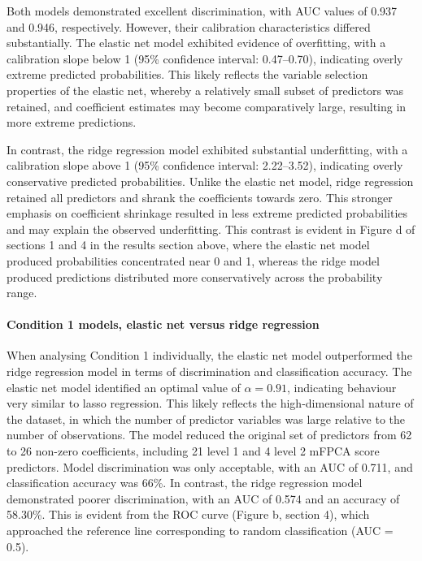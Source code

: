 \documentclass{article}
\begin{document}
Both models demonstrated excellent discrimination, with AUC values of
0.937 and 0.946, respectively. However, their calibration
characteristics differed substantially. The elastic net model exhibited
evidence of overfitting, with a calibration slope below 1 (95\%
confidence interval: 0.47--0.70), indicating overly extreme predicted
probabilities. This likely reflects the variable selection properties of
the elastic net, whereby a relatively small subset of predictors was
retained, and coefficient estimates may become comparatively large,
resulting in more extreme predictions.

In contrast, the ridge regression model exhibited substantial
underfitting, with a calibration slope above 1 (95\% confidence
interval: 2.22--3.52), indicating overly conservative predicted
probabilities. Unlike the elastic net model, ridge regression retained
all predictors and shrank the coefficients towards zero. This stronger
emphasis on coefficient shrinkage resulted in less extreme predicted
probabilities and may explain the observed underfitting. This contrast
is evident in Figure d of sections 1 and 4 in the results section above,
where the elastic net model produced probabilities concentrated near 0
and 1, whereas the ridge model produced predictions distributed more
conservatively across the probability range.

\paragraph{Condition 1 models, elastic net versus ridge
regression}\label{condition-1-models-elastic-net-versus-ridge-regression}

When analysing Condition 1 individually, the elastic net model
outperformed the ridge regression model in terms of discrimination and
classification accuracy. The elastic net model identified an optimal
value of \(\alpha = 0.91\), indicating behaviour very similar to lasso
regression. This likely reflects the high-dimensional nature of the
dataset, in which the number of predictor variables was large relative
to the number of observations. The model reduced the original set of
predictors from 62 to 26 non-zero coefficients, including 21 level 1 and
4 level 2 mFPCA score predictors. Model discrimination was only
acceptable, with an AUC of 0.711, and classification accuracy was 66\%.
In contrast, the ridge regression model demonstrated poorer
discrimination, with an AUC of 0.574 and an accuracy of 58.30\%. This is
evident from the ROC curve (Figure b, section 4), which approached the
reference line corresponding to random classification (AUC = 0.5).
\end{document}
